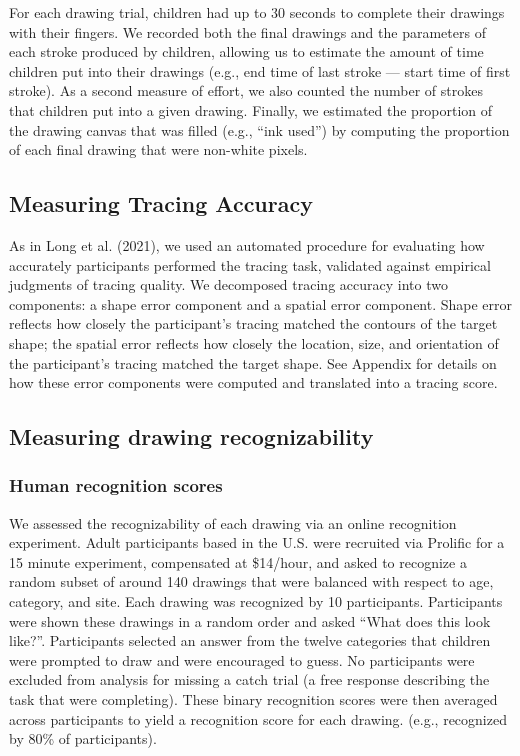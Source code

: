 \documentclass[
  english,
  man]{apa6}
\begin{document}
For each drawing trial, children had up to 30 seconds to complete their drawings with their fingers. We recorded both the final drawings and the parameters of each stroke produced by children, allowing us to estimate the amount of time children put into their drawings (e.g., end time of last stroke --- start time of first stroke). As a second measure of effort, we also counted the number of strokes that children put into a given drawing. Finally, we estimated the proportion of the drawing canvas that was filled (e.g., \enquote{ink used}) by computing the proportion of each final drawing that were non-white pixels.

\hypertarget{measuring-tracing-accuracy}{%
\subsection{Measuring Tracing Accuracy}\label{measuring-tracing-accuracy}}

As in Long et al. (2021), we used an automated procedure for evaluating how accurately participants performed the tracing task, validated against empirical judgments of tracing quality. We decomposed tracing accuracy into two components: a shape error component and a spatial error component. Shape error reflects how closely the participant's tracing matched the contours of the target shape; the spatial error reflects how closely the location, size, and orientation of the participant's tracing matched the target shape. See Appendix for details on how these error components were computed and translated into a tracing score.

\hypertarget{measuring-drawing-recognizability}{%
\subsection{Measuring drawing recognizability}\label{measuring-drawing-recognizability}}

\hypertarget{human-recognition-scores}{%
\subsubsection{Human recognition scores}\label{human-recognition-scores}}

We assessed the recognizability of each drawing via an online recognition experiment. Adult participants based in the U.S. were recruited via Prolific for a 15 minute experiment, compensated at \$14/hour, and asked to recognize a random subset of around 140 drawings that were balanced with respect to age, category, and site. Each drawing was recognized by 10 participants. Participants were shown these drawings in a random order and asked \enquote{What does this look like?}. Participants selected an answer from the twelve categories that children were prompted to draw and were encouraged to guess. No participants were excluded from analysis for missing a catch trial (a free response describing the task that were completing). These binary recognition scores were then averaged across participants to yield a recognition score for each drawing.
(e.g., recognized by 80\% of participants).
\end{document}
